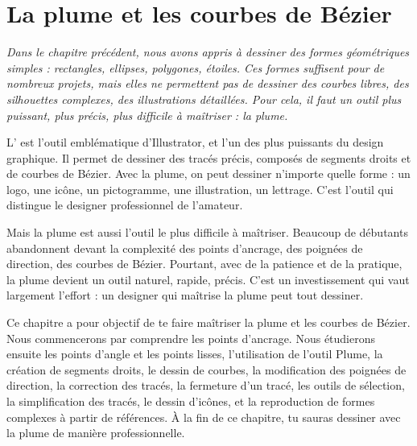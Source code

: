 
\chapter{La plume et les courbes de Bézier}

\noindent
\textit{Dans le chapitre précédent, nous avons appris à dessiner des formes géométriques simples : rectangles, ellipses, polygones, étoiles. Ces formes suffisent pour de nombreux projets, mais elles ne permettent pas de dessiner des courbes libres, des silhouettes complexes, des illustrations détaillées. Pour cela, il faut un outil plus puissant, plus précis, plus difficile à maîtriser : la plume.}

\vspace{1em}

\noindent
L' est l'outil emblématique d'Illustrator, et l'un des plus puissants du design graphique. Il permet de dessiner des tracés précis, composés de segments droits et de courbes de Bézier. Avec la plume, on peut dessiner n'importe quelle forme : un logo, une icône, un pictogramme, une illustration, un lettrage. C'est l'outil qui distingue le designer professionnel de l'amateur.

\vspace{1em}

\noindent
Mais la plume est aussi l'outil le plus difficile à maîtriser. Beaucoup de débutants abandonnent devant la complexité des points d'ancrage, des poignées de direction, des courbes de Bézier. Pourtant, avec de la patience et de la pratique, la plume devient un outil naturel, rapide, précis. C'est un investissement qui vaut largement l'effort : un designer qui maîtrise la plume peut tout dessiner.

\vspace{1em}

\noindent
Ce chapitre a pour objectif de te faire maîtriser la plume et les courbes de Bézier. Nous commencerons par comprendre les points d'ancrage. Nous étudierons ensuite les points d'angle et les points lisses, l'utilisation de l'outil Plume, la création de segments droits, le dessin de courbes, la modification des poignées de direction, la correction des tracés, la fermeture d'un tracé, les outils de sélection, la simplification des tracés, le dessin d'icônes, et la reproduction de formes complexes à partir de références. À la fin de ce chapitre, tu sauras dessiner avec la plume de manière professionnelle.


